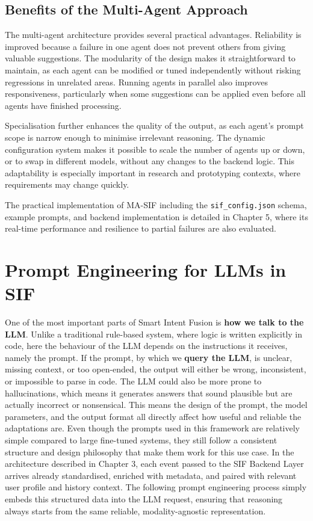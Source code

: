 \documentclass[openany]{book}
\begin{document}
\subsection{Benefits of the Multi-Agent Approach}
The multi-agent architecture provides several practical advantages. Reliability is improved because a failure in one agent does not prevent others from giving valuable suggestions. The modularity of the design makes it straightforward to maintain, as each agent can be modified or tuned independently without risking regressions in unrelated areas. Running agents in parallel also improves responsiveness, particularly when some suggestions can be applied even before all agents have finished processing.

Specialisation further enhances the quality of the output, as each agent’s prompt scope is narrow enough to minimise irrelevant reasoning. The dynamic configuration system makes it possible to scale the number of agents up or down, or to swap in different models, without any changes to the backend logic. This adaptability is especially important in research and prototyping contexts, where requirements may change quickly.

The practical implementation of MA-SIF including the \texttt{sif\_config.json} schema, example prompts, and backend implementation is detailed in Chapter 5, where its real-time performance and resilience to partial failures are also evaluated.

\section{Prompt Engineering for LLMs in SIF}
One of the most important parts of Smart Intent Fusion is \textbf{how we talk to the LLM}.
Unlike a traditional rule-based system, where logic is written explicitly in code, here the behaviour of the LLM depends on the instructions it receives, namely the prompt.
If the prompt, by which we \textbf{query the LLM}, is unclear, missing context, or too open-ended, the output will either be wrong, inconsistent, or impossible to parse in code.
The LLM could also be more prone to hallucinations, which means it generates answers that sound plausible but are actually incorrect or nonsensical. This means the design of the prompt, the model parameters, and the output format all directly affect how useful and reliable the adaptations are. Even though the prompts used in this framework are relatively simple compared to large fine-tuned systems, they still follow a consistent structure and design philosophy that make them work for this use case. In the architecture described in Chapter 3, each event passed to the SIF Backend Layer arrives already standardised, enriched with metadata, and paired with relevant user profile and history context. The following prompt engineering process simply embeds this structured data into the LLM request, ensuring that reasoning always starts from the same reliable, modality-agnostic representation.
\end{document}
